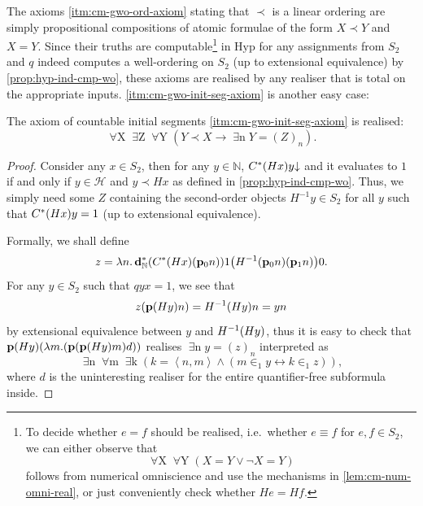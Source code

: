 \documentclass[12pt,openany]{book}
\theoremstyle{plain}
\theoremstyle{definition}
\newcommand\tuple[1]{\left\langle #1 \right\rangle}
\newcommand\opA[1]{\mathop{\forall #1}}
\newcommand\opE[1]{\mathop{\exists #1}}
\newcommand\oplam[1]{\mathop{\lambda #1.}}
\newcommand\Hyp{\mathrm{Hyp}}
\newcommand\bp{\mathbf{p}}
\newcommand\bdN{\mathbf{d}_\mathbb{N}}
\begin{document}
The axioms \ref{itm:cm-gwo-ord-axiom} stating that $\prec$ is a linear ordering are simply propositional compositions of atomic formulae of the form $X \prec Y$ and $X = Y$. Since their truths are computable\footnote{To decide whether $e = f$ should be realised, i.e.\ whether $e \equiv f$ for $e, f \in S_2$, we can either observe that
  \[\opA{X} \opA{Y} \left(X = Y \lor \neg X = Y\right)\] follows from numerical omniscience and use the mechanisms in \autoref{lem:cm-num-omni-real}, or just conveniently check whether $He = Hf$.} in $\Hyp$ for any assignments from $S_2$ and $q$ indeed computes a well-ordering on $S_2$ (up to extensional equivalence) by \autoref{prop:hyp-ind-cmp-wo}, these axioms are realised by any realiser that is total on the appropriate inputs. \ref{itm:cm-gwo-init-seg-axiom} is another easy case:
\begin{lemma}
  The axiom of countable initial segments \ref{itm:cm-gwo-init-seg-axiom} is realised:
  \[\opA{X} \opE{Z} \opA{Y} \left(Y \prec X \rightarrow \opE{n} Y = \left(Z\right)_n\right).\]
\end{lemma}

\begin{proof}
  Consider any $x \in S_2$, then for any $y \in \mathbb{N}$, $C^* \mleft(Hx\mright) y {\downarrow}$ and it evaluates to $1$ if and only if $y \in \mathcal{H}$ and $y \prec Hx$ as defined in \autoref{prop:hyp-ind-cmp-wo}. Thus, we simply need some $Z$ containing the second-order objects $H^{-1} y \in S_2$ for all $y$ such that $C^* \mleft(Hx\mright) y = 1$ (up to extensional equivalence).

  Formally, we shall define
  \[z = \oplam{n} \bdN^* \mleft(C^* \mleft(Hx\mright) \mleft(\bp_0 n\mright)\mright) 1 \mleft(H^{-1} \mleft(\bp_0 n\mright) \mleft(\bp_1 n\mright)\mright) 0.\]
  For any $y \in S_2$ such that $qyx = 1$, we see that
  \[z \mleft(\bp \mleft(Hy\mright) n\mright) = H^{-1} \mleft(Hy\mright) n = yn\]
  by extensional equivalence between $y$ and $H^{-1} \mleft(Hy\mright)$, thus it is easy to check that $\bp \mleft(Hy\mright) \mleft(\oplam{m} \mleft(\bp \mleft(\bp \mleft(Hy\mright) m\mright) d\mright)\mright)$ realises $\opE{n} y = \left(z\right)_{n}$ interpreted as
  \[\opE{n} \opA{m} \opE{k} \left(k = \tuple{n, m} \land \left(m \in_1 y \leftrightarrow k \in_1 z\right)\right),\]
  where $d$ is the uninteresting realiser for the entire quantifier-free subformula inside.
\end{proof}
\end{document}
